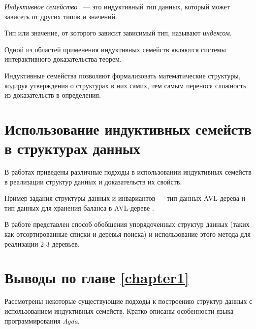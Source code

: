 \begin{definition}
\emph{Индуктивное семейство} \cite{DybjerIndFam, RefiningIT}~— это индуктивный тип данных,
который может зависеть от других типов и значений.

Тип или значение, от которого зависит зависимый тип, называют \emph{индексом}.
\end{definition}

Одной из областей применения индуктивных семейств являются системы интерактивного
доказательства теорем.

Индуктивные семейства позволяют формализовать математические структуры,
кодируя утверждения о структурах в них самих,
тем самым перенося сложность из доказательств в определения.

\section{Использование индуктивных семейств в структурах данных}
В работах \cite{HongweiXi, McBridePivotal} приведены различные подходы
в использовании индуктивных семейств в реализации структур данных
и доказательств их свойств.

Пример задания структуры данных и инвариантов —
тип данных AVL-дерева и тип данных для хранения баланса в AVL-дереве \cite{AVLTree}.



В работе \cite{McBridePivotal} представлен способ обобщения
упорядоченных структур данных
(таких как отсортированные списки и деревья поиска)
и использование этого метода для реализации 2-3 деревьев.

\section{Выводы по главе \ref{chapter1}}

Рассмотрены некоторые существующие подходы к построению структур данных
с использованием индуктивных семейств.
Кратко описаны особенности языка программирования \textit{Agda}.
